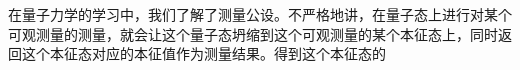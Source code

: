

在量子力学的学习中，我们了解了测量公设。不严格地讲，在量子态上进行对某个可观测量的测量，就会让这个量子态坍缩到这个可观测量的某个本征态上，同时返回这个本征态对应的本征值作为测量结果。得到这个本征态的